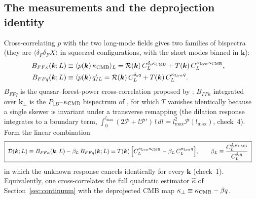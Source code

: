 \documentclass[11pt,a4paper]{article}
\newcommand{\dF}{\delta_F}
\newcommand{\PP}{\mathcal{P}}
\newcommand{\kcmb}{\kappa_{\rm CMB}}
\newcommand{\klya}{\kappa_{{\rm Ly}\alpha}}
\begin{document}
\subsection{The measurements and the deprojection identity}
\label{sec:three-measure}

Cross-correlating $p$ with the two long-mode fields gives two families of bispectra (they are $\langle\dF\dF X\rangle$ in squeezed configurations, with the short modes binned in $\bm k$):
\begin{align}
B_{FF\kappa}(\bm k;L)&\equiv\langle p(\bm k)\,\kcmb\rangle_L=\mathcal R(\bm k)\,C_L^{\delta_{\rm s}\kcmb}+T(\bm k)\,C_L^{\klya\kcmb},\label{eq:BFFk}\\
B_{FFq}(\bm k;L)&\equiv\langle p(\bm k)\,q\rangle_L=\mathcal R(\bm k)\,C_L^{\delta_{\rm s}q}+T(\bm k)\,C_L^{\klya q}.\label{eq:BFFq}
\end{align}
$B_{FFq}$ is the quasar--forest-power cross-correlation proposed by \citet{1701.03375}; $B_{FF\kappa}$ integrated over $\bm k_\perp$ is the $P_{1D}$--$\kcmb$ bispectrum of \citet{1607.03625,2405.14988}, for which $T$ vanishes identically because a single skewer is invariant under a transverse remapping (the dilation response integrates to a boundary term, $\int_0^{l_{\max}}(2\PP+l\PP')\,l\,dl=l_{\max}^2\PP(l_{\max})$, check~4). Form the linear combination
\begin{equation}
\boxed{\;\mathcal D(\bm k;L)\equiv B_{FF\kappa}(\bm k;L)-\beta_L\,B_{FFq}(\bm k;L)=T(\bm k)\,\Big[C_L^{\klya\kcmb}-\beta_L\,C_L^{\klya q}\Big],\qquad
\beta_L\equiv\frac{C_L^{\delta_{\rm s}\kcmb}}{C_L^{\delta_{\rm s}q}}\;}
\label{eq:deproj}
\end{equation}
in which the unknown response cancels identically for every $\bm k$ (check~1). Equivalently, one cross-correlates the full quadratic estimator $\hat\kappa$ of Section~\ref{sec:continuum} with the deprojected CMB map $\kappa_\perp\equiv\kcmb-\beta q$.
\end{document}
